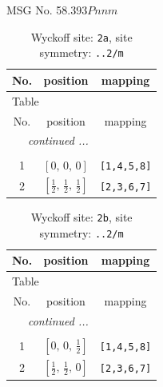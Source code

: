 \documentclass[fleqn,8pt]{jsarticle}
\begin{document}
\setcounter{MaxMatrixCols}{32}

\renewcommand{\tablename}{Table~}
\renewcommand{\figurename}{Figure~}
\begin{center}
\LARGE
MSG No. 58.393\quad$Pnnm$
\end{center}
\renewcommand{\arraystretch}{1.2}
\begin{longtable}{ccc}
\caption{Wyckoff site: {\tt 2a}, site symmetry: {\tt ..2/m}}
 \\
 \hline \hline
No. & position & mapping \\ \hline \endfirsthead

\multicolumn{2}{l}{\tablename\ \thetable{}} \\
 \hline \hline
No. & position & mapping \\ \hline \endhead

 \hline \hline
\multicolumn{2}{r}{\footnotesize\it continued ...} \\ \endfoot

 \hline \hline
\multicolumn{2}{r}{} \\ \endlastfoot

1 & $\left[ 0,\, 0,\, 0 \right]$ & {\tt [1,4,5,8]} \\ \hline
2 & $\left[ \frac{1}{2},\, \frac{1}{2},\, \frac{1}{2} \right]$ & {\tt [2,3,6,7]} \\
\end{longtable}
\renewcommand{\arraystretch}{1.2}
\begin{longtable}{ccc}
\caption{Wyckoff site: {\tt 2b}, site symmetry: {\tt ..2/m}}
 \\
 \hline \hline
No. & position & mapping \\ \hline \endfirsthead

\multicolumn{2}{l}{\tablename\ \thetable{}} \\
 \hline \hline
No. & position & mapping \\ \hline \endhead

 \hline \hline
\multicolumn{2}{r}{\footnotesize\it continued ...} \\ \endfoot

 \hline \hline
\multicolumn{2}{r}{} \\ \endlastfoot

1 & $\left[ 0,\, 0,\, \frac{1}{2} \right]$ & {\tt [1,4,5,8]} \\ \hline
2 & $\left[ \frac{1}{2},\, \frac{1}{2},\, 0 \right]$ & {\tt [2,3,6,7]} \\
\end{longtable}
\end{document}
